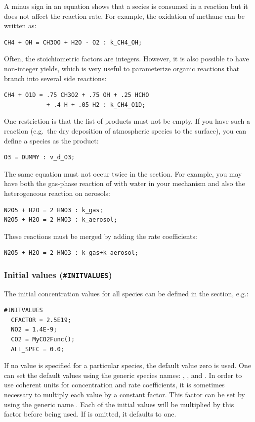 \documentclass[twoside]{article}
\begin{document}
A minus sign in an equation shows that a secies is consumed in a
reaction but it does not affect the reaction rate. For example, the
oxidation of methane can be written as:
%
\begin{verbatim}
CH4 + OH = CH3OO + H2O - O2 : k_CH4_OH;
\end{verbatim}
%
Often, the stoichiometric factors are integers. However, it is also
possible to have non-integer yields, which is very useful to
parameterize organic reactions that branch into several side reactions:
%
\begin{verbatim}
CH4 + O1D = .75 CH3O2 + .75 OH + .25 HCHO
            + .4 H + .05 H2 : k_CH4_O1D;
\end{verbatim}
%
One restriction is that the list of products must not be empty. If you
have such a reaction (e.g.\ the dry deposition of atmospheric species to
the surface), you can define a  species as the product:
%
\begin{verbatim}
O3 = DUMMY : v_d_O3;
\end{verbatim}
%
The same equation must not occur twice in the  section.
For example, you may have both the gas-phase reaction of 
with water in your mechanism and also the heterogeneous reaction on
aerosols:
%
\begin{verbatim}
N2O5 + H2O = 2 HNO3 : k_gas;
N2O5 + H2O = 2 HNO3 : k_aerosol;
\end{verbatim}
%
These reactions must be merged by adding the rate coefficients:
%
\begin{verbatim}
N2O5 + H2O = 2 HNO3 : k_gas+k_aerosol;
\end{verbatim}

\subsubsection{Initial values ({\tt\#INITVALUES})}
\label{sec:section-initvalues}

The initial concentration values for all species can be defined in the
 section, e.g.:
%
\begin{verbatim}
#INITVALUES
  CFACTOR = 2.5E19;
  NO2 = 1.4E-9;
  CO2 = MyCO2Func();
  ALL_SPEC = 0.0;
\end{verbatim}
%
If no value is specified for a particular species, the default value
zero is used. One can set the default values using the generic species
names: , , and . In order
to use coherent units for concentration and rate coefficients, it is
sometimes necessary to multiply each value by a constant factor. This
factor can be set by using the generic name . Each of the
initial values will be multiplied by this factor before being used. If
 is omitted, it defaults to one.
\end{document}
